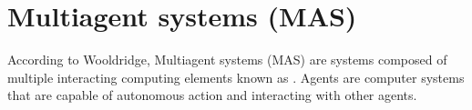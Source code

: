 \section{Multiagent systems (MAS)}
According to Wooldridge\cite{woolridge_introduction_2001}, Multiagent systems (MAS) are systems composed of multiple interacting computing elements known as . Agents are computer systems that are capable of autonomous action and interacting with other agents.
